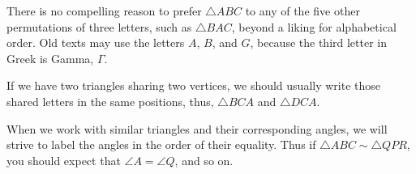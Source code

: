 \documentclass[11pt, oneside]{article}
\begin{document}
There is no compelling reason to prefer $\triangle ABC$ to any of the five other permutations of three letters, such as $\triangle BAC$, beyond a liking for alphabetical order.  Old texts may use the letters $A$, $B$, and $G$, because the third letter in Greek is Gamma, $\Gamma$.

If we have two triangles sharing two vertices, we should usually write those shared letters in the same positions, thus, $\triangle BCA$ and $\triangle DCA$.

When we work with similar triangles and their corresponding angles, we will strive to label the angles in the order of their equality.  Thus if $\triangle ABC \sim \triangle QPR$, you should expect that $\angle A = \angle Q$, and so on.
\end{document}
